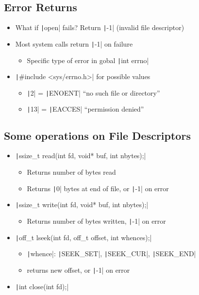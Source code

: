\subsection{Error Returns}
\begin{itemize}[nosep]
    \item What if \texttt|open| fails? Return \texttt|-1| (invalid file descriptor)
    \item Most system calls return \texttt|-1| on failure
          \begin{itemize}[nosep]
              \item Specific type of error in gobal \texttt|int errno|
          \end{itemize}
    \item \texttt|#include <sys/errno.h>| for possible values
          \begin{itemize}[nosep]
              \item \texttt|2| = \texttt|ENOENT| ``no such file or directory''
              \item \texttt|13| = \texttt|EACCES| ``permission denied''
          \end{itemize}
\end{itemize}
\subsection{Some operations on File Descriptors}
\begin{itemize}[nosep]
    \item \texttt|ssize_t read(int fd, void* buf, int nbytes);|
          \begin{itemize}[nosep]
              \item Returns number of bytes read
              \item Returns \texttt|0| bytes at end of file, or \texttt|-1| on error
          \end{itemize}
    \item \texttt|ssize_t write(int fd, void* buf, int nbytes);|
          \begin{itemize}[nosep]
              \item Returns number of bytes written, \texttt|-1| on error
          \end{itemize}
    \item \texttt|off_t lseek(int fd, off_t offset, int whences);|
          \begin{itemize}[nosep]
              \item \texttt|whence|: \texttt|SEEK_SET|, \texttt|SEEK_CUR|, \texttt|SEEK_END|
              \item returns new offset, or \texttt|-1| on error
          \end{itemize}
    \item \texttt|int close(int fd);|
\end{itemize}
